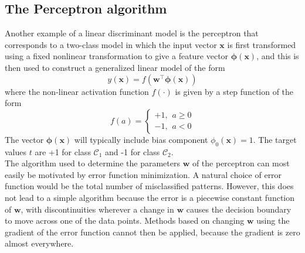 \documentclass[twoside]{article}
\begin{document}
\subsection{The Perceptron algorithm}
Another example of a linear discriminant model is the perceptron that corresponds to a two-class model in which the input vector $\boldsymbol{x}$ is first transformed using a fixed nonlinear transformation to give a feature vector $\boldsymbol{\phi}(\boldsymbol{x})$, and this is then used to construct a generalized linear model of the form 
\begin{equation}
    y(\boldsymbol{x}) = f(\boldsymbol{w^\intercal}\boldsymbol{\phi}(\boldsymbol{x}))
\end{equation}
where the non-linear activation function $f(\cdot)$ is given by a step function of the form
\begin{equation*}
f(a) =
\begin{cases}
    +1,\hspace{5pt} a \geq 0\\
    -1,\hspace{5pt} a < 0
\end{cases}
\end{equation*}
The vector $\boldsymbol{\phi}(\boldsymbol{x})$ will typically include bias component $\phi_0(\boldsymbol{x}) = 1$. The target values $t$ are +1 for class $\mathcal{C}_1$ and -1 for class $\mathcal{C}_2$.\\
The algorithm used to determine the parameters $\boldsymbol{w}$ of the perceptron can most easily be motivated by error function minimization. A natural choice of error function would be the total number of misclassified patterns. However, this does not lead to a simple algorithm because the error is a piecewise constant function of $\boldsymbol{w}$, with discontinuities wherever a change in $\boldsymbol{w}$ causes the decision boundary to move across one of the data points. Methods based on changing $\boldsymbol{w}$ using the gradient of the error function cannot then be applied, because the gradient is zero almost everywhere.\medskip
\end{document}
